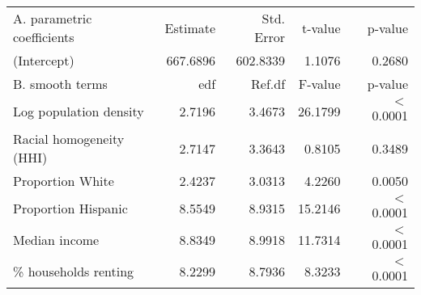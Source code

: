 \begin{table}[ht]
\centering
\begin{tabular}{lrrrr}
   \hline
A. parametric coefficients & Estimate & Std. Error & t-value & p-value \\ 
  (Intercept) & 667.6896 & 602.8339 & 1.1076 & 0.2680 \\ 
   \hline
B. smooth terms & edf & Ref.df & F-value & p-value \\ 
  Log population density & 2.7196 & 3.4673 & 26.1799 & $<$ 0.0001 \\ 
  Racial homogeneity (HHI) & 2.7147 & 3.3643 & 0.8105 & 0.3489 \\ 
  Proportion White & 2.4237 & 3.0313 & 4.2260 & 0.0050 \\ 
  Proportion Hispanic & 8.5549 & 8.9315 & 15.2146 & $<$ 0.0001 \\ 
  Median income & 8.8349 & 8.9918 & 11.7314 & $<$ 0.0001 \\ 
  \% households renting & 8.2299 & 8.7936 & 8.3233 & $<$ 0.0001 \\ 
   \hline
\end{tabular}
\caption{ } 
\label{Demographic GAM}
\end{table}
